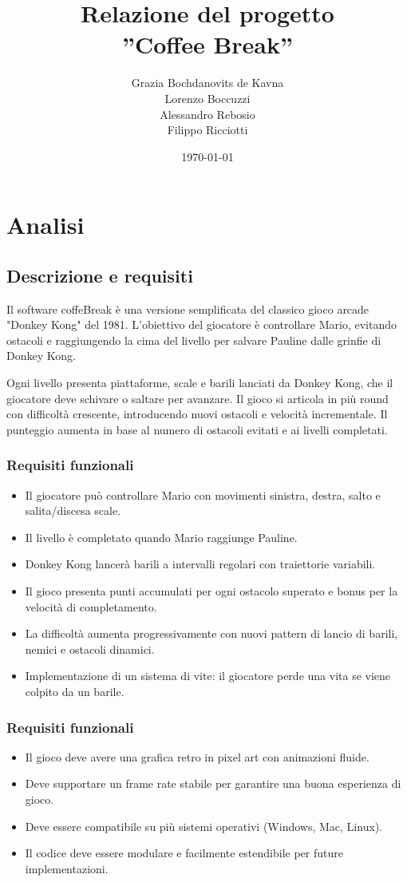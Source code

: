 \documentclass[a4paper,12pt]{report}
\title{Relazione del progetto\\''Coffee Break''}
\author{
	Grazia Bochdanovits de Kavna\\
	Lorenzo Boccuzzi\\
	Alessandro Rebosio\\
	Filippo Ricciotti\\
}
\date{\today}
\begin{document}
\maketitle

\tableofcontents

\chapter{Analisi}

\section{Descrizione e requisiti}

Il software coffeBreak è una versione semplificata del classico gioco arcade "Donkey Kong" del 1981. L'obiettivo 
del giocatore è controllare Mario, evitando ostacoli e raggiungendo la cima del livello per salvare Pauline 
dalle grinfie di Donkey Kong.

Ogni livello presenta piattaforme, scale e barili lanciati da Donkey Kong, che il giocatore deve 
schivare o saltare per avanzare. Il gioco si articola in più round con difficoltà crescente, introducendo 
nuovi ostacoli e velocità incrementale. 
Il punteggio aumenta in base al numero di ostacoli evitati e ai livelli completati.

\subsection*{Requisiti funzionali}
\begin{itemize}
	\item Il giocatore può controllare Mario con movimenti sinistra, destra, salto e salita/discesa scale.
	\item Il livello è completato quando Mario raggiunge Pauline.
	\item Donkey Kong lancerà barili a intervalli regolari con traiettorie variabili.
	\item Il gioco presenta punti accumulati per ogni ostacolo superato e bonus per la velocità di completamento.
	\item La difficoltà aumenta progressivamente con nuovi pattern di lancio di barili, nemici e ostacoli dinamici.
	\item Implementazione di un sistema di vite: il giocatore perde una vita se viene colpito da un barile.
\end{itemize}
\subsection*{Requisiti funzionali}
\begin{itemize}
	\item Il gioco deve avere una grafica retro in pixel art con animazioni fluide.
	\item Deve supportare un frame rate stabile per garantire una buona esperienza di gioco.
	\item Deve essere compatibile su più sistemi operativi (Windows, Mac, Linux).
	\item Il codice deve essere modulare e facilmente estendibile per future implementazioni.
\end{itemize}
\end{document}
